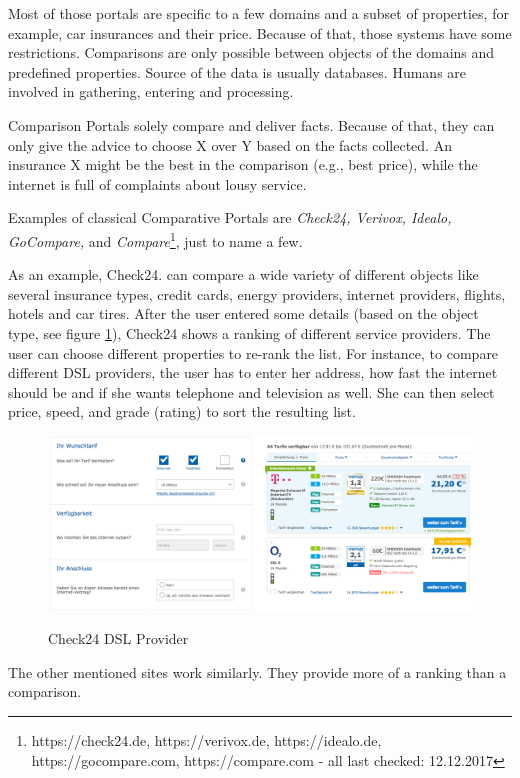 Most of those portals are specific to a few domains and a subset of properties, for example, car insurances and their price. Because of that, those systems have some restrictions. Comparisons are only possible between objects of the domains and predefined properties. Source of the data is usually databases. Humans are involved in gathering, entering and processing. 

Comparison Portals solely compare and deliver facts. Because of that, they can only give the advice to choose X over Y based on the facts collected.  An insurance X might be the best in the comparison (e.g., best price), while the internet is full of complaints about lousy service.\newline

Examples of classical Comparative Portals are \emph{Check24, Verivox, Idealo, GoCompare,} and \emph{Compare}\footnote{https://check24.de, https://verivox.de, https://idealo.de, https://gocompare.com, https://compare.com - all last checked: 12.12.2017}, just to name a few.

As an example, Check24. can compare a wide variety of different objects like several insurance types, credit cards, energy providers, internet providers, flights, hotels and car tires. After the user entered some details (based on the object type, see figure \ref{img:check24}), Check24 shows a ranking of different service providers. The user can choose different properties to re-rank the list.
For instance, to compare different DSL providers, the user has to enter her address, how fast the internet should be and if she wants telephone and television as well. She can then select price, speed, and grade (rating) to sort the resulting list.

\begin{figure}[h]
\includegraphics[width=1\textwidth]{images/ds-sys/check24}
\label{img:check24}
\caption{Check24 DSL Provider}
\end{figure}
The other mentioned sites work similarly. They provide more of a ranking than a comparison.\newline


